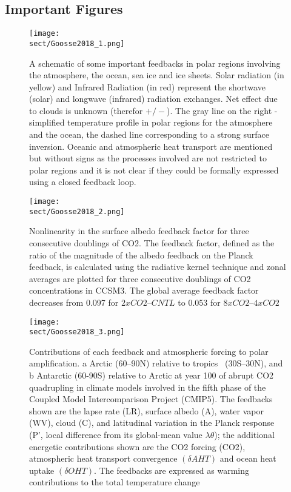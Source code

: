 \documentclass{article}
\begin{document}
\subsection*{Important Figures}
\begin{figure}[ht]
    \centering
    \vspace{-4mm}
    \texttt{[image: \\sect/Goosse2018\_1.png]}
    \vspace{-4mm}
    \caption{A schematic of some important feedbacks in polar regions involving  the atmosphere, the ocean, sea ice and ice sheets.  
    Solar radiation (in yellow) and Infrared Radiation (in red) represent the shortwave (solar) and longwave (infrared) radiation exchanges. 
    Net effect due to clouds is unknown (therefor \(+/-\)). 
    The gray line on the right - simplified temperature profile in polar regions for the atmosphere and the ocean, the dashed line corresponding to a strong surface inversion. 
    Oceanic and atmospheric heat transport are mentioned but without signs as the processes involved are not restricted to polar regions and it is not clear if they could be formally expressed using a closed feedback loop.}
    \label{f:Goosse2018_1}
\end{figure}
\begin{figure}[ht]
    \centering
    \vspace{-4mm}
    \texttt{[image: \\sect/Goosse2018\_2.png]}
    \vspace{-4mm}
    \caption{Nonlinearity in the surface albedo feedback factor for three consecutive doublings of CO2. The feedback factor, defined as the ratio of the magnitude of the albedo feedback on the Planck feedback, is calculated using the radiative kernel technique and zonal averages are plotted for three consecutive doublings of CO2 concentrations in CCSM3. The global average feedback factor decreases from 0.097 for $2xCO2–CNTL$ to 0.053 for $8xCO2–4xCO2$}
    \label{f:Goosse2018_2}
\end{figure}
\begin{figure}[ht]
    \centering
    \vspace{-4mm}
    \texttt{[image: \\sect/Goosse2018\_3.png]}
    \vspace{-4mm}
    \caption{Contributions of each feedback and atmospheric forcing to polar amplification. a Arctic (60–90N) relative to tropics \ (30S–30N), and b Antarctic (60-90S) relative to Arctic at year 100 of abrupt CO2 quadrupling in climate models involved in the fifth phase of the Coupled Model Intercomparison Project (CMIP5). 
    The feedbacks shown are the lapse rate (LR), surface albedo (A), water vapor (WV), cloud (C), and latitudinal variation in the Planck response (P’, local difference from its global-mean value \(\lambda \theta \)); the additional energetic contributions shown are the CO2 forcing (CO2), atmospheric heat transport convergence $( \delta AHT )$ and ocean heat uptake $( \delta OHT )$. 
    The feedbacks are expressed as warming contributions to the total temperature change}
    \label{f:Goosse2018_3}
\end{figure}
\end{document}
